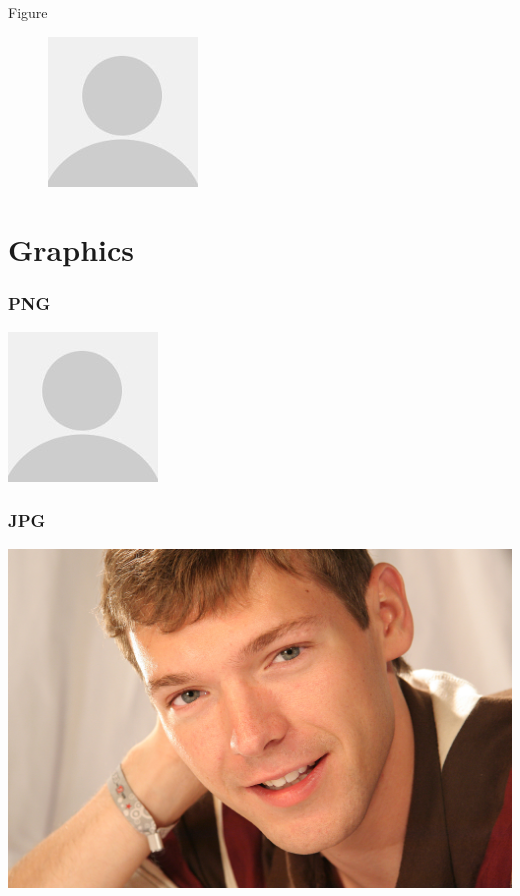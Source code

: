 \documentclass{Beamer}
\begin{document}
\begin{frame}{Figure}
  \begin{figure}
    \includegraphics{avatar}
  \end{figure}
\end{frame}

\section{Graphics}

\begin{frame}
  \frametitle{PNG}
  \begin{center}
    \includegraphics{avatar}
  \end{center}
\end{frame}

\begin{frame}
  \frametitle{JPG}
  \begin{center}
    \includegraphics{5075}
  \end{center}
\end{frame}
\end{document}

